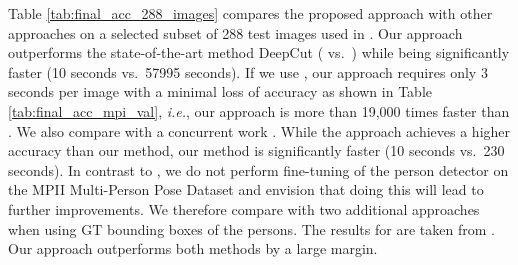 \documentclass[runningheads]{llncs}
\newcommand{\ie}{\mbox{\emph{i.e.}}}
\begin{document}
Table \ref{tab:final_acc_288_images} compares the proposed approach with other approaches on a selected subset of 288 test images used in \cite{pishchulin2015deepcut}. Our approach outperforms the state-of-the-art method DeepCut \cite{pishchulin2015deepcut} ( vs.~) while being significantly faster (10 seconds vs.~57995 seconds). If we use , our approach requires only 3 seconds per image with a minimal loss of accuracy as shown in Table \ref{tab:final_acc_mpi_val}, \ie, our approach is more than 19,000 times faster than \cite{pishchulin2015deepcut}. We also compare with a concurrent work \cite{insafutdinov2016deepercut}. While the approach \cite{insafutdinov2016deepercut} achieves a higher accuracy than our method, our method is significantly faster (10 seconds vs.~230 seconds). In contrast to \cite{insafutdinov2016deepercut}, we do not perform fine-tuning of the person detector on the MPII Multi-Person Pose Dataset and envision that doing this will lead to further improvements. We therefore compare with two additional approaches \cite{pishchulin2015deepcut, chen_nips2014} when using GT bounding boxes of the persons. The results for \cite{chen_nips2014} are taken from \cite{pishchulin2015deepcut}. Our approach outperforms both methods by a large margin.

\begin{table*}[t]
  \centering
  \footnotesize
  \setlength{\tabcolsep}{2.8pt} 
\def\arraystretch{1}

  \caption{Pose estimation results (AP) on the withheld test set of the MPII Multi-Person Pose Dataset.}
  \label{tab:final_acc_full_mpi}
\end{table*}
\end{document}
